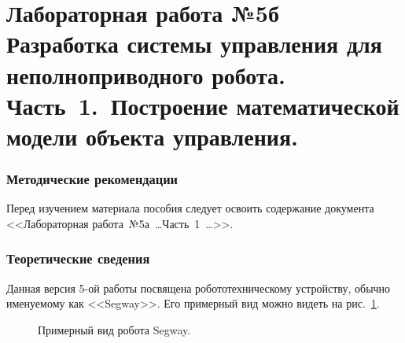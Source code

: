 \documentclass[12pt,a4paper,openany]{extarticle}
\begin{document}
\part*{Лабораторная работа №5б\\
Разработка системы управления для неполноприводного робота.\\ {\LARGE Часть~1.~Построение математической модели объекта управления.}}

\section{Методические рекомендации}
\hspace*{\parindent}Перед изучением материала пособия следует освоить содержание документа <<Лабораторная работа~№5а~\dots Часть~1~\dots>>. 

\section{Теоретические сведения}
\hspace*{\parindent}Данная версия 5-ой работы посвящена робототехническому устройству, обычно именуемому как <<Segway>>.
Его примерный вид можно видеть на рис.~\ref{main_segway_photo}.

\begin{figure}[h]
	\noindent{}
	\caption{Примерный вид робота Segway.}
	\label{main_segway_photo}
\end{figure}
\end{document}
